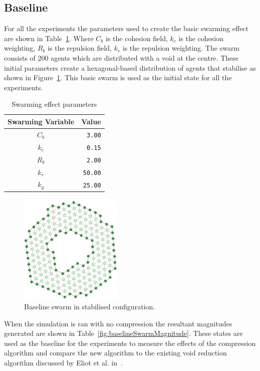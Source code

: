 \documentclass[12pt,a4paper]{IEEEtran}
\begin{document}
\subsection{Baseline}
For all the experiments the parameters used to create the basic swarming effect are shown in Table~\ref{tab:swarmingEffect}. Where $C_b$ is the cohesion field, $k_c$ is the cohesion weighting, $R_b$ is the repulsion field, $k_r$ is the repulsion weighting. The swarm consists of 200 agents which are distributed with a void at the centre. These initial parameters create a hexagonal-based distribution of agents that stabilise as shown in Figure~\ref{fig:baselineSwarm}. This basic swarm is used as the initial state for all the experiments. 
 \begin{table}[h]
	\centering
	\tiny
	\begin{tabular}{|c|r|}
		\hline
		\rowcolor[HTML]{000000} 
		{\color[HTML]{FFFFFF} Swarming Variable} & {\color[HTML]{FFFFFF} Value} \\ \hline
		$C_b$ & \texttt{3.00} \\ \hline
		$k_c$ & \texttt{0.15}  \\ \hline
		$R_b$ & \texttt{2.00} \\ \hline
		$k_r$ & \texttt{50.00} \\ \hline
		$k_g$ & \texttt{25.00} \\ \hline
	\end{tabular}
  	\caption{Swarming effect parameters}
  	\label{tab:swarmingEffect}
\end{table}

\begin{figure}[H]
	\begin{center}
		\includegraphics[width=5cm]{figures/exp1Start}
	\end{center}
	\caption{Baseline swarm in stabilised configuration. \label{fig:baselineSwarm}}
\end{figure}

When the simulation is ran with no compression the resultant magnitudes generated are shown in Table~\ref{fig:baselineSwarmMagnitude}. These states are used as the baseline for the experiments to measure the effects of the compression algorithm and compare the new algorithm to the existing void reduction algorithm discussed by Eliot et al. in~\cite{eliot2018metric}.
\end{document}
